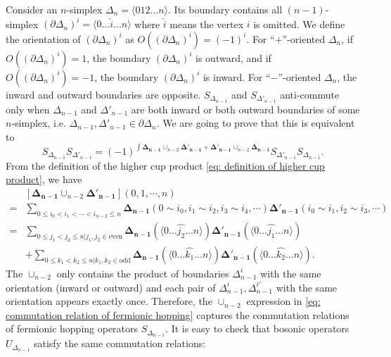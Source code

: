 \documentclass[12pt]{article}
\begin{document}
 Consider an $n$-simplex $\Delta_n = \langle 012 \dots n \rangle$. Its boundary contains all $(n-1)$-simplex $ (\partial \Delta_n)^i = \langle 0 \dots \hat{i} \dots n \rangle$ where $\hat{i}$ means the vertex $i$ is omitted. We define the orientation of $(\partial \Delta_n)^i$ as $O((\partial \Delta_n)^i) = (-1)^i$. For ``$+$''-oriented $\Delta_n$, if $O((\partial \Delta_n)^i)=1$, the boundary $(\partial \Delta_n)^i$ is outward, and if $O((\partial \Delta_n)^i)=-1$, the boundary $(\partial \Delta_n)^i$ is inward. For ``$-$''-oriented $\Delta_n$, the inward and outward boundaries are opposite. $S_{\Delta_{n-1}}$ and $S_{\Delta'_{n-1}}$ anti-commute only when $\Delta_{n-1}$ and $\Delta'_{n-1}$ are both inward or both outward boundaries of some $n$-simplex, i.e. $\Delta_{n-1}, \Delta'_{n-1} \in \partial \Delta_n$. We are going to prove that this is equivalent to
\begin{equation}
    S_{\Delta_{n-1}} S_{\Delta'_{n-1}} = (-1)^{\int \boldsymbol {\Delta_{n-1}} \cup_{n-2} \boldsymbol {\Delta'_{n-1}}  + \boldsymbol {\Delta'_{n-1}} \cup_{n-2} \boldsymbol {\Delta_{n-1}} } S_{\Delta'_{n-1}} S_{\Delta_{n-1}}.
\label{eq: commutation relation of fermionic hopping}
\end{equation}
From the definition of the higher cup product \eqref{eq: definition of higher cup product}, we have
\begin{equation}
    \begin{split}
        &[\boldsymbol {\Delta_{n-1}} \cup_{n-2} \boldsymbol {\Delta'_{n-1}}](0,1,\cdots,n) \\
        =&\sum_{0 \leq i_0 < i_1 < \cdots < i_{n-2} \leq n} \boldsymbol {\Delta_{n-1}}(0\sim i_0,i_1 \sim i_2, i_3 \sim i_4, \cdots) \boldsymbol {\Delta'_{n-1}}(i_0\sim i_1, i_2 \sim i_3, \cdots) \\
        =& \sum_{0 \leq j_1 < j_2 \leq n| j_1,j_2 \in \text{even} } \boldsymbol {\Delta_{n-1}} (\langle 0 \dots \hat{j_2} \dots n \rangle) \boldsymbol {\Delta'_{n-1}} (\langle 0 \dots \hat{j_1} \dots n \rangle) \\
        &+ \sum_{0 \leq k_1 < k_2 \leq n| k_1,k_2 \in \text{odd} } \boldsymbol {\Delta_{n-1}} (\langle 0 \dots \hat{k_1} \dots n \rangle) \boldsymbol {\Delta'_{n-1}} (\langle 0 \dots \hat{k_2} \dots n \rangle).
    \end{split}
\label{eq: definition of cup n-2}
\end{equation}
The $\cup_{n-2}$ only contains the product of boundaries $\Delta^i_{n-1}$ with the same orientation (inward or outward) and each pair of $\Delta^i_{n-1}, \Delta^{i'}_{n-1}$ with the same orientation appears exactly once. Therefore, the $\cup_{n-2}$ expression in \eqref{eq: commutation relation of fermionic hopping} captures the commutation relations of fermionic hopping operators $S_{\Delta_{n-1}}$. It is easy to check that bosonic operators $U_{\Delta_{n-1}}$ satisfy the same commutation relations:
\end{document}
